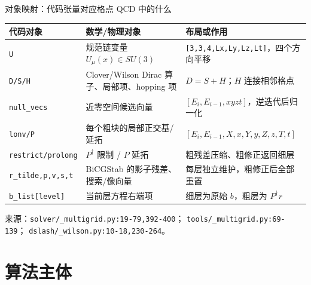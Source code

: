 \documentclass[UTF8,aspectratio=169,11pt]{ctexbeamer}
\newcommand{\source}[1]{%
  \vspace{0.06em}\par{\raggedright\scriptsize\color{muted}来源：#1\par}}
\newcommand{\pathref}[1]{\nolinkurl{#1}}
\begin{document}
\begin{frame}[t]{对象映射：代码张量对应格点 QCD 中的什么}
  \begin{center}
    \scriptsize
    \begin{tabular}{@{}P{0.18\textwidth}P{0.48\textwidth}P{0.28\textwidth}@{}}
      \toprule
      代码对象 & 数学/物理对象 & 布局或作用 \\
      \midrule
      \texttt{U} & 规范链变量 $U_\mu(x)\in SU(3)$ & \texttt{[3,3,4,Lx,Ly,Lz,Lt]}，四个方向平移 \\
      \texttt{D/S/H} & Clover/Wilson Dirac 算子、局部项、hopping 项 & $D=S+H$；$H$ 连接相邻格点 \\
      \texttt{null\_vecs} & 近零空间候选向量 & $[E_i,E_{i-1},xyzt]$，逆迭代后归一化 \\
      \texttt{lonv/P} & 每个粗块的局部正交基/延拓 & $[E_i,E_{i-1},X,x,Y,y,Z,z,T,t]$ \\
      \texttt{restrict/prolong} & $P^\dagger$ 限制 / $P$ 延拓 & 粗残差压缩、粗修正返回细层 \\
      \texttt{r\_tilde,p,v,s,t} & BiCGStab 的影子残差、搜索/像向量 & 每层独立维护，粗修正后全部重置 \\
      \texttt{b\_list[level]} & 当前层方程右端项 & 细层为原始 $b$，粗层为 $P^\dagger r$ \\
      \bottomrule
    \end{tabular}
  \end{center}
  \source{\pathref{solver/_multigrid.py:19-79,392-400}；
  \pathref{tools/_multigrid.py:69-139}；
  \pathref{dslash/_wilson.py:10-18,230-264}。}
\end{frame}

\section{算法主体}
\end{document}
